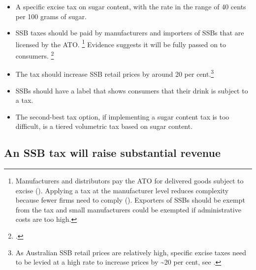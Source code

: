 \documentclass[embargoed]{grattan}
\begin{document}
\begin{itemize}
\item
  A specific excise tax on sugar content, with the rate in the range of 40 cents per 100 grams of sugar.
\item
  SSB taxes should be paid by manufacturers and importers of SSBs that are licensed by the ATO.%
\footnote{Manufacturers and distributors pay the ATO for delivered goods subject to excise (\textcite{Office2016Reportingexcisepaying}).
Applying a tax at the manufacturer level reduces complexity because fewer firms need to comply (\textcites{Freebairn2010Taxationobesity}{CnossenExcisetaxationAustralia}).
Exporters of SSBs should be exempt from the tax and small manufacturers could be exempted if administrative costs are too high.} Evidence suggests it will be fully passed on to consumers.%
\footcites{Grogger2015Sodataxesprices}{Bergman2010Areexcisetaxes}{Berardi2016impactsodataxon}{Bonnet2013Taxincidencestrategic}{Solutions2016BestPracticesDesigning}
\item
  The tax should increase SSB retail prices by around 20 per cent.\footnote{\textcite{Organization2016FiscalPoliciesDiet}
As Australian SSB retail prices are relatively high, specific excise taxes need to be levied at a high rate to increase prices by \textasciitilde{}20 per cent, see \textcite{Long2015Costeffectivenesssugar}.}
\item
  SSBs should have a label that shows consumers that their drink is subject to a tax.
\item
  The second-best tax option, if implementing a sugar content tax is too difficult, is a tiered volumetric tax based on sugar content.
\end{itemize}


\subsection{An SSB tax will raise substantial revenue}\label{an-ssb-tax-will-raise-substantial-revenue}
\end{document}
